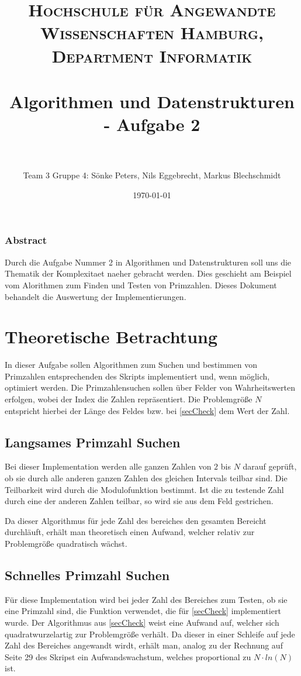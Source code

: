\documentclass[paper=a4, fontsize=11pt]{scrartcl} %
\title{
\normalfont \normalsize
\textsc{Hochschule für Angewandte Wissenschaften Hamburg, Department Informatik} \\ [25pt] %
\horrule{0.5pt} \\[0.4cm] %
\huge Algorithmen und Datenstrukturen - Aufgabe 2 \\ %
\horrule{2pt} \\[0.5cm] %
}
\author{Team 3 Gruppe 4: Sönke Peters, Nils Eggebrecht, Markus Blechschmidt} %
\date{\normalsize\today} %
\numberwithin{equation}{section} %
\numberwithin{figure}{section} %
\numberwithin{table}{section} %
\begin{document}
\maketitle %

\subsubsection*{Abstract}
Durch die Aufgabe Nummer 2 in Algorithmen und Datenstrukturen soll uns die
Thematik der Komplexitaet naeher gebracht werden. Dies geschieht am Beispiel vom
Alorithmen zum Finden und Testen von Primzahlen. Dieses Dokument behandelt die
Auswertung der Implementierungen.

\renewcommand{\contentsname}{Inhaltsangabe}
\renewcommand*\listtablename{Tabellen}
\renewcommand*\listfigurename{Darstellungen}
\tableofcontents
\listoftables
\listoffigures

\section{Theoretische Betrachtung}

In dieser Aufgabe sollen Algorithmen zum Suchen und bestimmen von Primzahlen
entsprechenden des Skripts implementiert und, wenn m\"oglich, optimiert werden.
Die Primzahlensuchen sollen \"uber Felder von Wahrheitswerten erfolgen, wobei der
Index die Zahlen repr\"asentiert. Die Problemgr\"o{\ss}e $N$ entspricht hierbei
der L\"ange des Feldes bzw. bei \ref{secCheck} dem Wert der Zahl.

\subsection{Langsames Primzahl Suchen}\label{secSlow}
Bei dieser Implementation werden alle ganzen Zahlen von $2$ bis $N$ darauf
gepr\"uft, ob sie durch alle anderen ganzen Zahlen des gleichen Intervals teilbar
sind. Die Teilbarkeit wird durch die Modulofunktion bestimmt. Ist die zu testende
Zahl durch eine der anderen Zahlen teilbar, so wird sie aus dem Feld gestrichen.

Da dieser Algorithmus f\"ur jede Zahl des bereiches den gesamten Bereicht durchl\"auft,
erh\"alt man theoretisch einen Aufwand, welcher relativ zur Problemgr\"o{\ss}e
quadratisch w\"achst.

\subsection{Schnelles Primzahl Suchen}\label{secFast}
F\"ur diese Implementation wird bei jeder Zahl des Bereiches zum Testen, ob sie
eine Primzahl sind, die Funktion verwendet, die f\"ur \ref{secCheck} implementiert
wurde. Der Algorithmus aus \ref{secCheck} weist eine Aufwand auf, welcher sich
quadratwurzelartig zur Problemgr\"o{\ss}e verh\"alt. Da dieser in einer Schleife
auf jede Zahl des Bereiches angewandt wirdt, erh\"alt man, analog zu der Rechnung
auf Seite 29 des Skripst ein Aufwandswachstum, welches proportional zu $N \cdot ln(N)$ ist.
\end{document}

